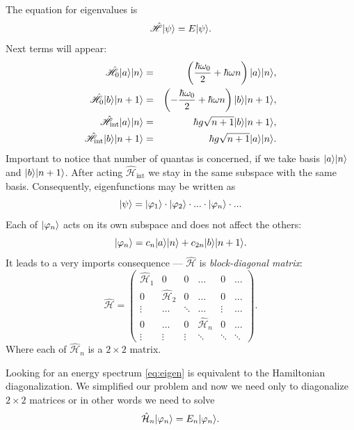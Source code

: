 The equation for eigenvalues is 
\begin{equation}
\hat{\mathscr{H}} \lvert\psi\rangle = E \lvert\psi\rangle.
\label{eq:eigen} 
\end{equation}
Next terms will appear:
\begin{eqnarray}
	\hat{\mathscr{H}}_0 \lvert a\rangle \lvert n\rangle &=& \left( \frac{\hbar \omega_0}{2} + \hbar \omega n \right) \lvert a\rangle \lvert n\rangle, \\
	\hat{\mathscr{H}}_0 \lvert b\rangle \lvert n+1\rangle &=& \left( -\frac{\hbar \omega_0}{2} + \hbar \omega n \right) \lvert b\rangle \lvert n+1\rangle, \\
	\hat{\mathscr{H}}_{\text{int}} \lvert a\rangle \lvert n\rangle &=& \hbar g \sqrt{n+1} \lvert b\rangle \lvert n+1\rangle, \\
	\hat{\mathscr{H}}_{\text{int}} \lvert b\rangle \lvert n+1\rangle &=& \hbar g \sqrt{n+1} \lvert a\rangle \lvert n\rangle.
\end{eqnarray}
Important to notice that number of quantas is concerned, if we take  basis $\lvert a\rangle \lvert n\rangle$ and $\lvert b\rangle \lvert n+1\rangle$. After acting $\hat{\mathscr{H}}_{\text{int}}$ we stay in the same subspace with the same basis. Consequently, eigenfunctions may be written as
\begin{equation}
	\lvert\psi\rangle = \lvert\varphi_1\rangle \cdot \lvert\varphi_2\rangle \cdot ... \cdot \lvert\varphi_n\rangle \cdot ...
\end{equation}
Each of $\lvert\varphi_n\rangle$ acts on its own subspace and does not affect the others:
\begin{equation}
	\lvert\varphi_n\rangle = c_n \lvert a\rangle \lvert n\rangle + c_{2n} \lvert b\rangle \lvert n+1\rangle.
\end{equation}
It leads to a very imports consequence --- $\hat{\mathscr{H}}$ is \textit{block-diagonal matrix}:
\begin{equation}
	\hat{\mathscr{H}} = 
	\begin{pmatrix}
		\hat{\mathcal{H}}_1 & 0 & 0 & \dots & 0 & \dots \\
		0& \hat{\mathcal{H}}_2 &0 & \dots &0 & \dots\\
		\vdots & \dots  & \ddots & \dots & \vdots & \dots \\
		0 & \dots & 0& \hat{\mathcal{H}}_n & 0 & \dots \\
		\vdots & \vdots & \vdots & \ddots & \ddots & \ddots
	\end{pmatrix}.
\end{equation}
Where each of $\hat{\mathcal{H}}_n$ is a $2\times2$ matrix.

Looking for an energy spectrum \eqref{eq:eigen} is equivalent to the Hamiltonian diagonalization.
We simplified our problem and now we need only to diagonalize $2 \times 2$ matrices or in other words we need to solve
\begin{equation}
	\hat{\mathcal{H}}_n \lvert\varphi_n\rangle = E_n \lvert\varphi_n\rangle.
\end{equation}

